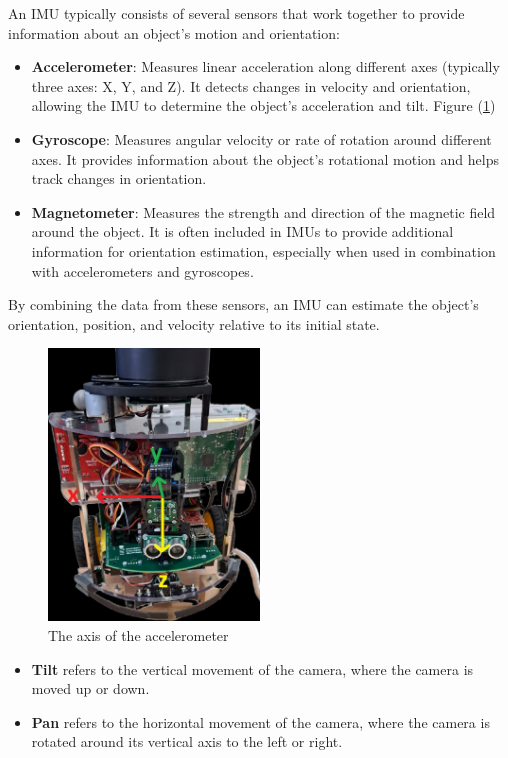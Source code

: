 \documentclass[english]{article}
\begin{document}
An IMU typically consists of several sensors that work together to
provide information about an object's motion and orientation:
\begin{itemize}
    \item \textbf{Accelerometer}: Measures linear acceleration along different axes 
    (typically three axes: X, Y, and Z). It detects changes in velocity 
    and orientation, allowing the IMU to determine the object's 
    acceleration and tilt. Figure (\ref{fig:acc})
    \item \textbf{Gyroscope}: Measures angular velocity or rate of rotation 
    around different axes. It provides information about the object's 
    rotational motion and helps track changes in orientation.
    \item \textbf{Magnetometer}: Measures the strength and direction of the
     magnetic field around the object. It is often included in IMUs to 
     provide additional information for orientation estimation,
    especially when used in combination with accelerometers and
    gyroscopes. 
\end{itemize}
By combining the data from these sensors, an IMU can estimate the
 object's orientation, position, and velocity relative to its initial 
 state. 
 \begin{figure}[!h]
     \centering
     \includegraphics[width=0.50\textwidth, height=0.4\textheight]{figures/Lab2_1.png}
     \caption{The axis of the accelerometer}
     \label{fig:acc}
 \end{figure}
 \begin{itemize}
    \item \textbf{Tilt} refers to the vertical movement 
    of the camera, where the camera is moved up or down.
    \item \textbf{Pan} refers to the horizontal movement of the 
    camera, where the camera is rotated around its vertical axis
     to the left or right. 
 \end{itemize}
\end{document}
